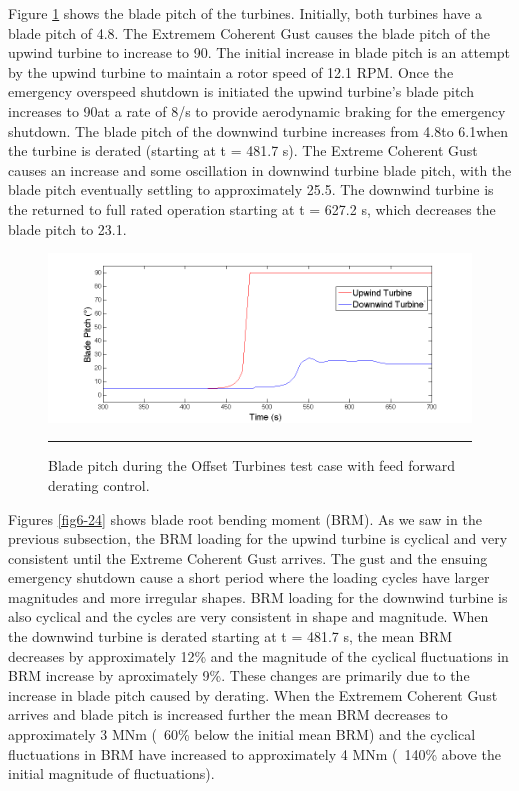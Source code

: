 Figure \ref{fig6-23} shows the blade pitch of the turbines. Initially, both turbines have a blade pitch of 4.8\degree. The Extremem Coherent Gust causes the blade pitch of the upwind turbine to increase to 90\degree. The initial increase in blade pitch is an attempt by the upwind turbine to maintain a rotor speed of 12.1 RPM. Once the emergency overspeed shutdown is initiated the upwind turbine's blade pitch increases to 90\degree at a rate of 8\degree/s to provide aerodynamic braking for the emergency shutdown. The blade pitch of the downwind turbine increases from 4.8\degree to 6.1\degree when the turbine is derated (starting at t = 481.7 s). The Extreme Coherent Gust causes an increase and some oscillation in downwind turbine blade pitch, with the blade pitch eventually settling to approximately 25.5\degree. The downwind turbine is the returned to full rated operation starting at t = 627.2 s, which decreases the blade pitch to 23.1\degree.

\begin{figure}[htbp] \label{fig6-23}
	\centering
		\includegraphics[trim = {1cm 0 2cm 0}, clip, width = \linewidth]{Figures/ch6Figures/fig6-23.png}
		\rule{35em}{0.5pt}
	\caption{Blade pitch during the Offset Turbines test case with feed forward derating control.}
\end{figure}

Figures \ref{fig6-24} shows blade root bending moment (BRM). As we saw in the previous subsection, the BRM loading for the upwind turbine is cyclical and very consistent until the Extreme Coherent Gust arrives. The gust and the ensuing emergency shutdown cause a short period where the loading cycles have larger magnitudes and more irregular shapes. BRM loading for the downwind turbine is also cyclical and the cycles are very consistent in shape and magnitude. When the downwind turbine is derated starting at t = 481.7 s, the mean BRM decreases by approximately 12\% and the magnitude of the cyclical fluctuations in BRM increase by aproximately 9\%. These changes are primarily due to the increase in blade pitch caused by derating. When the Extremem Coherent Gust arrives and blade pitch is increased further the mean BRM decreases to approximately 3 MNm (~60\% below the initial mean BRM) and the cyclical fluctuations in BRM have increased to approximately 4 MNm (~140\% above the initial magnitude of fluctuations).

